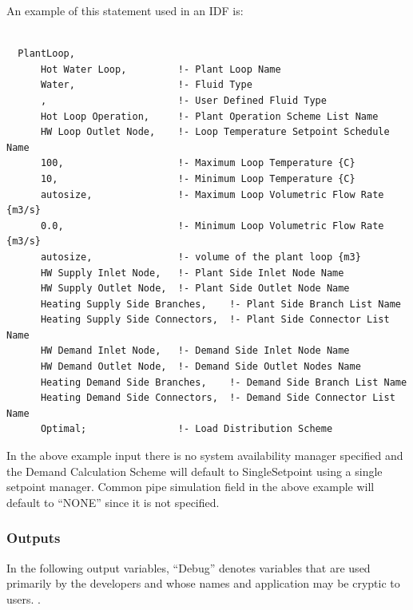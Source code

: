 An example of this statement used in an IDF is:

\begin{lstlisting}

  PlantLoop,
      Hot Water Loop,         !- Plant Loop Name
      Water,                  !- Fluid Type
      ,                       !- User Defined Fluid Type
      Hot Loop Operation,     !- Plant Operation Scheme List Name
      HW Loop Outlet Node,    !- Loop Temperature Setpoint Schedule Name
      100,                    !- Maximum Loop Temperature {C}
      10,                     !- Minimum Loop Temperature {C}
      autosize,               !- Maximum Loop Volumetric Flow Rate {m3/s}
      0.0,                    !- Minimum Loop Volumetric Flow Rate {m3/s}
      autosize,               !- volume of the plant loop {m3}
      HW Supply Inlet Node,   !- Plant Side Inlet Node Name
      HW Supply Outlet Node,  !- Plant Side Outlet Node Name
      Heating Supply Side Branches,    !- Plant Side Branch List Name
      Heating Supply Side Connectors,  !- Plant Side Connector List Name
      HW Demand Inlet Node,   !- Demand Side Inlet Node Name
      HW Demand Outlet Node,  !- Demand Side Outlet Nodes Name
      Heating Demand Side Branches,    !- Demand Side Branch List Name
      Heating Demand Side Connectors,  !- Demand Side Connector List Name
      Optimal;                !- Load Distribution Scheme
\end{lstlisting}

In the above example input there is no system availability manager specified and the Demand Calculation Scheme will default to SingleSetpoint using a single setpoint manager. Common pipe simulation field in the above example will default to ``NONE'' since it is not specified.

\subsubsection{Outputs}\label{outputs-024}

In the following output variables, ``Debug'' denotes variables that are used primarily by the developers and whose names and application may be cryptic to users. .

